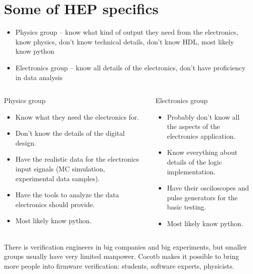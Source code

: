 \documentclass[aspectratio=169]{beamer}
\begin{document}
\section*{Some of HEP specifics}
\begin{frame}{\secname}
  \begin{itemize}
    \item Physics group -- know what kind of output they need from the electronics, know physics, 
      don't know technical details, don't know HDL, most likely know python
    \item Electronics group -- know all details of the electronics, don't have proficiency in data analysis
  \end{itemize}
   \begin{columns}
     \begin{column}{0.5\textwidth}
       \begin{block}{Physics group}
           \begin{itemize}
           \item Know what they need the electronics for.
           \item Don't know the details of the digital design. 
           \item Have the realistic data for the electronics input signals 
             (MC simulation, experimental data samples).
           \item Have the tools to analyze the data electronics should provide.
           \item Most likely know python.
           \end{itemize}
         
       \end{block}
     \end{column}
     \begin{column}{0.5\textwidth}
       \begin{block}{Electronics group}
         \begin{itemize}
           \item Probably don't know all the aspects of the electronics application. 
           \item Know everything about details of the logic implementation. 
           \item Have their osciloscopes and pulse generators for the basic testing. 
           \item Most likely know python. 
         \end{itemize}
         
       \end{block}
       
     \end{column}
   \end{columns}
    
   There is verification engineers in big companies and big experiments, but smaller groups usually have very limited manpower. Cocotb makes it possible to bring more people into firmware verification: students, software experts, physicists. 

\end{frame}
\end{document}

